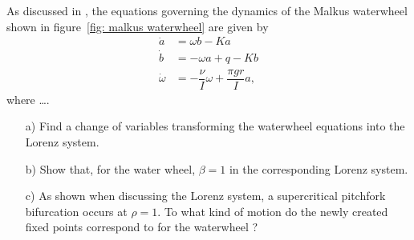 \begin{problem}
  As discussed in \cite{??}, the equations governing the dynamics of the Malkus waterwheel shown in figure~\ref{fig: malkus waterwheel} are given by
  \[
  \begin{aligned}
    \dot{a} & = \omega b - K a \\
    \dot{b} & = -\omega a + q - Kb \\
    \dot{\omega} & = -\dfrac{\nu}{I} \omega + \dfrac{\pi g r}{I} a,
  \end{aligned}
  \]
  where \ldots .

  \begin{enumerate}
  \item[a)] Find a change of variables transforming the waterwheel equations into the Lorenz system.
  \item[b)] Show that, for the water wheel, $\beta = 1$ in the corresponding Lorenz system.
  \item[c)] As shown when discussing the Lorenz system, a supercritical pitchfork bifurcation occurs at $\rho = 1$.
    To what kind of motion do the newly created fixed points correspond to for the waterwheel ?
  \end{enumerate}
\end{problem}
